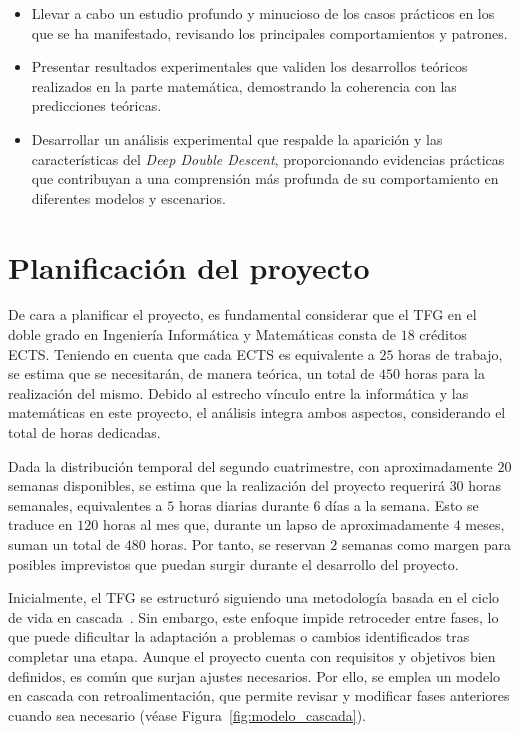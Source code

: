 \begin{itemize}
    \item Llevar a cabo un estudio profundo y minucioso de los casos prácticos en los que se ha manifestado, revisando los principales comportamientos y patrones.
    \item Presentar resultados experimentales que validen los desarrollos teóricos realizados en la parte matemática, demostrando la coherencia con las predicciones teóricas.
    \item Desarrollar un análisis experimental que respalde la aparición y las características del \textit{Deep Double Descent}, proporcionando evidencias prácticas que contribuyan a una comprensión más profunda de su comportamiento en diferentes modelos y escenarios.
\end{itemize}

\section{Planificación del proyecto}

De cara a planificar el proyecto, es fundamental considerar que el TFG en el doble grado en Ingeniería Informática y Matemáticas consta de $18$ créditos ECTS. Teniendo en cuenta que cada ECTS es equivalente a $25$ horas de trabajo, se estima que se necesitarán, de manera teórica, un total de $450$ horas para la realización del mismo. Debido al estrecho vínculo entre la informática y las matemáticas en este proyecto, el análisis integra ambos aspectos, considerando el total de horas dedicadas.

Dada la distribución temporal del segundo cuatrimestre, con aproximadamente $20$ semanas disponibles, se estima que la realización del proyecto requerirá $30$ horas semanales, equivalentes a $5$ horas diarias durante $6$ días a la semana. Esto se traduce en $120$ horas al mes que, durante un lapso de aproximadamente $4$ meses, suman un total de $480$ horas. Por tanto, se reservan $2$ semanas como margen para posibles imprevistos que puedan surgir durante el desarrollo del proyecto.

Inicialmente, el TFG se estructuró siguiendo una metodología basada en el ciclo de vida en cascada~\cite{Pressman1994}. Sin embargo, este enfoque impide retroceder entre fases, lo que puede dificultar la adaptación a problemas o cambios identificados tras completar una etapa. Aunque el proyecto cuenta con requisitos y objetivos bien definidos, es común que surjan ajustes necesarios. Por ello, se emplea un modelo en cascada con retroalimentación, que permite revisar y modificar fases anteriores cuando sea necesario (véase Figura~\ref{fig:modelo_cascada}).

